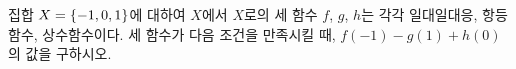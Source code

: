 집합 $X=\{-1{,}\mkern3mu\mathopen{}0{,}\mkern3mu\mathopen{}1\}$에 대하여 $X$에서 $X$로의 세 함수 $f$, $g$, $h$는 각각 일대일대응, 항등함수, 상수함수이다. 세 함수가 다음 조건을 만족시킬 때, $f(-1)-g(1)+h(0)$의 값을 구하시오. 
